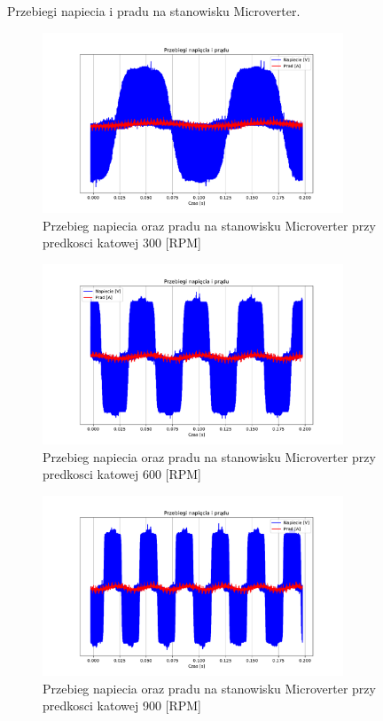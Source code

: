 \documentclass[11pt]{article}
\begin{document}
Przebiegi napiecia i pradu na stanowisku Microverter.\\

\begin{figure}[H]
\centering
\includegraphics[width=0.8\textwidth]{aun1_microverter_rpm300.pdf}
\caption{Przebieg napiecia oraz pradu na stanowisku Microverter przy predkosci katowej 300 [RPM]}
\end{figure}

\begin{figure}[H]
\centering
\includegraphics[width=0.8\textwidth]{aun1_microverter_rpm600.pdf}
\caption{Przebieg napiecia oraz pradu na stanowisku Microverter przy predkosci katowej 600 [RPM]}
\end{figure}

\begin{figure}[H]
\centering
\includegraphics[width=0.8\textwidth]{aun1_microverter_rpm900.pdf}
\caption{Przebieg napiecia oraz pradu na stanowisku Microverter przy predkosci katowej 900 [RPM]}
\end{figure}
\end{document}
